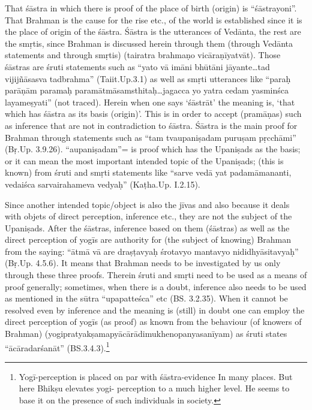 That śāstra in which there is proof of the place of birth (origin) is “śāstrayoni”. That Brahman is the cause for the rise etc., of the world is established since it is the place of origin of the śāstra. Śāstra is the utterances of Vedānta, the rest are the smṛtis, since Brahman is discussed herein through them (through Vedānta statements and through smṛtis) (tairatra brahmaṇo vicāraṇīyatvāt). Those śāstras are śruti statements such as “yato vā imāni bhūtāni jāyante…tad vijijñāsasva tadbrahma” (Taiit.Up.3.1) as well as smṛti utterances like “paraḥ parāṇām paramaḥ paramātmāsamsthitaḥ…jagacca yo yatra cedam yasminśca layameṣyati” (not traced). Herein when one says ‘śāstrāt’ the meaning is, ‘that which has śāstra as its basis (origin)’. This is in order to accept (pramāṇas) such as inference that are not in contradiction to śāstra. Śāstra is the main proof for Brahman through statements such as “tam tvaupaniṣadam puruṣam pṛcchāmi” (Bṛ.Up. 3.9.26). “aupaniṣadam”= is proof which has the Upaniṣads as the basis; or it can mean the most important intended topic of the Upaniṣads; (this is known) from śruti and smṛti statements like “sarve vedā yat padamāmananti, vedaiśca sarvairahameva vedyaḥ” (Kaṭha.Up. I.2.15).

Since another intended topic/object is also the jīvas and also because it deals with objets of direct perception, inference etc., they are not the subject  of the Upaniṣads. After the śāstras, inference based on them (śāstras) as well as the direct perception of yogīs are authority for (the subject of knowing) Brahman from the saying: “ātmā vā are draṣṭavyaḥ śrotavyo mantavyo nididhyāsitavyaḥ” (Bṛ.Up. 4.5.6). It means that Brahman needs to be investigated by us only through these three proofs. Therein śruti and smṛti need to be used as a means of proof generally; sometimes, when there is a doubt, inference also needs to be used as mentioned in the sūtra “upapatteśca” etc (BS. 3.2.35). When it cannot be resolved even by inference and the meaning is (still) in doubt one can employ the direct perception of yogīs (as proof) as known from the behaviour (of knowers of Brahman) (yogipratyakṣamapyācārādimukhenopanyasanīyam) as śruti states “ācāradarśanāt” (BS.3.4.3).\footnote{Yogī-perception is placed on par with śāstra-evidence In many places. But here Bhikṣu elevates yogi-
perception to a much higher level. He seems to base it on the presence of such individuals in society.} 

\vskip -2pt


